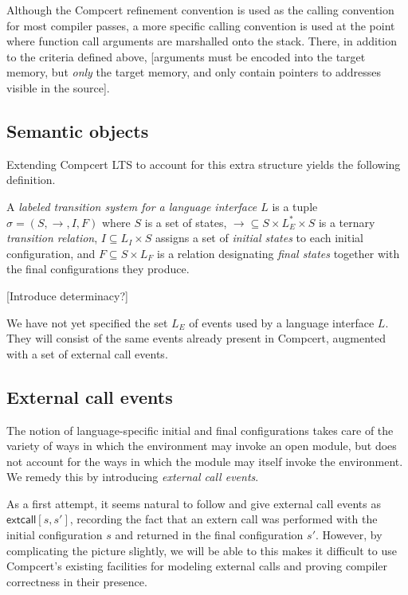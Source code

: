\documentclass[sigplan,10pt,review,anonymous]{acmart}
\newcommand{\kw}[1]{\ensuremath{ \textsf{#1} }}
\begin{document}
Although the Compcert refinement convention is used as
the calling convention for most compiler passes,
a more specific calling convention is used
at the point where function call arguments
are marshalled onto the stack.
There,
in addition to the criteria defined above,
[arguments must be encoded into the target memory,
but \emph{only} the target memory,
and only contain pointers to addresses visible in the source].


\subsection{Semantic objects} %

Extending Compcert LTS to account for
this extra structure yields the following definition.

\begin{definition}
A \emph{labeled transition system for a language interface $L$}
is a tuple $\sigma = (S, \rightarrow, I, F)$ where
$S$ is a set of states,
$\rightarrow \subseteq S \times L_E^* \times S$
is a ternary \emph{transition relation},
$I \subseteq L_I \times S$
assigns a set of \emph{initial states} to each initial configuration, and
$F \subseteq S \times L_F$
is a relation designating \emph{final states}
together with the final configurations they produce.
\end{definition}

[Introduce determinacy?]

We have not yet specified the set $L_E$ of events
used by a language interface $L$.
They will consist of the same events already present in Compcert,
augmented with a set of external call events.


\subsection{External call events} %

The notion of language-specific initial and final configurations
takes care of the variety of ways
in which the environment may invoke an open module,
but does not account for the ways in which
the module may itself invoke the environment.
We remedy this by introducing \emph{external call events}.

As a first attempt,
it seems natural to follow \cite{cpp2015}
and give external call events as $\kw{extcall}[s, s']$,
recording the fact that an extern call was performed
with the initial configuration $s$
and returned in the final configuration $s'$.
However,
by complicating the picture slightly,
we will be able to 
this makes it difficult to use Compcert's existing facilities
for modeling external calls
and proving compiler correctness in their presence.
\end{document}
